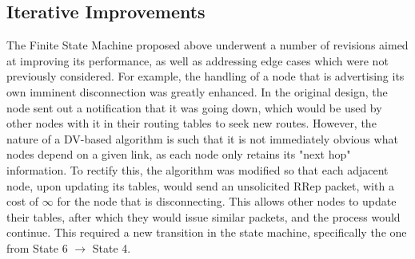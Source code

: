 \subsection{Iterative Improvements}\label{subsec:SMiterativeImprovements}
The Finite State Machine proposed above underwent a number of revisions aimed at improving its performance, as well as addressing edge cases which were not previously considered. For example, the handling of a node that is advertising its own imminent disconnection was greatly enhanced. In the original design, the node sent out a notification that it was going down, which would be used by other nodes with it in their routing tables to seek new routes. However, the nature of a DV-based algorithm is such that it is not immediately obvious what nodes depend on a given link, as each node only retains its "next hop" information. To rectify this, the algorithm was modified so that each adjacent node, upon updating its tables, would send an unsolicited RRep packet, with a cost of $\infty$ for the node that is disconnecting. This allows other nodes to update their tables, after which they would issue similar packets, and the process would continue. This required a new transition in the state machine, specifically the one from State 6 $\rightarrow$ State 4.